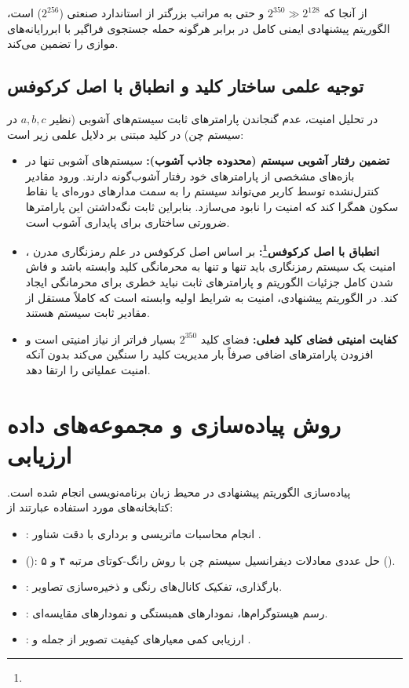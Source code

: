 از آنجا که $2^{350} \gg 2^{128}$ و حتی به مراتب بزرگتر از استاندارد صنعتی  ($2^{256}$) است، الگوریتم پیشنهادی ایمنی کامل در برابر هرگونه حمله جستجوی فراگیر با ابررایانه‌های موازی را تضمین می‌کند.

\subsection{توجیه علمی ساختار کلید و انطباق با اصل کرکوفس}

در تحلیل امنیت، عدم گنجاندن پارامترهای ثابت سیستم‌های آشوبی (نظیر $a, b, c$ در سیستم چن) در کلید مبتنی بر دلایل علمی زیر است:

\begin{itemize}
    \item \textbf{تضمین رفتار آشوبی سیستم (محدوده جاذب آشوب):} سیستم‌های آشوبی تنها در بازه‌های مشخصی از پارامترهای خود رفتار آشوب‌گونه دارند. ورود مقادیر کنترل‌نشده توسط کاربر می‌تواند سیستم را به سمت مدارهای دوره‌ای یا نقاط سکون همگرا کند که امنیت را نابود می‌سازد. بنابراین ثابت نگه‌داشتن این پارامترها ضرورتی ساختاری برای پایداری آشوب است.
    \item \textbf{انطباق با اصل کرکوفس\footnote{}:} بر اساس اصل کرکوفس در علم رمزنگاری مدرن \cite{ref36}، امنیت یک سیستم رمزنگاری باید تنها و تنها به محرمانگی کلید وابسته باشد و فاش شدن کامل جزئیات الگوریتم و پارامترهای ثابت نباید خطری برای محرمانگی ایجاد کند. در الگوریتم پیشنهادی، امنیت به شرایط اولیه وابسته است که کاملاً مستقل از مقادیر ثابت سیستم هستند.
    \item \textbf{کفایت امنیتی فضای کلید فعلی:} فضای کلید $2^{350}$ بسیار فراتر از نیاز امنیتی است و افزودن پارامترهای اضافی صرفاً بار مدیریت کلید را سنگین می‌کند بدون آنکه امنیت عملیاتی را ارتقا دهد.
\end{itemize}

\section{روش پیاده‌سازی و مجموعه‌های داده ارزیابی}

پیاده‌سازی الگوریتم پیشنهادی در محیط زبان برنامه‌نویسی \pyver{} انجام شده است. کتابخانه‌های مورد استفاده عبارتند از:
\begin{itemize}
    \item {}: انجام محاسبات ماتریسی و برداری با دقت شناور .
    \item {} (): حل عددی معادلات دیفرانسیل سیستم چن با روش رانگ-کوتای مرتبه ۴ و ۵ ().
    \item {}: بارگذاری، تفکیک کانال‌های رنگی و ذخیره‌سازی تصاویر.
    \item {}: رسم هیستوگرام‌ها، نمودارهای همبستگی و نمودارهای مقایسه‌ای.
    \item {}: ارزیابی کمی معیارهای کیفیت تصویر از جمله  و .
\end{itemize}

